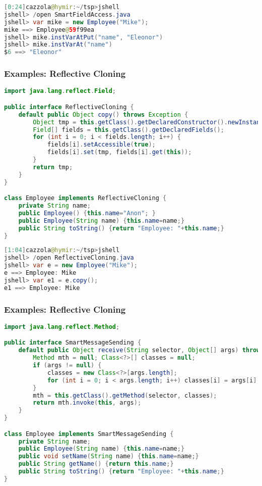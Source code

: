 \begin{lstlisting}[language=Java]
[0:24]cazzola@hymir:~/tsp>jshell
jshell> /open SmartFieldAccess.java
jshell> var mike = new Employee("Mike");
mike ==> Employee@59f99ea
jshell> mike.instVarAtPut("name", "Eleonor")
jshell> mike.instVarAt("name")
$6 ==> "Eleonor"
\end{lstlisting}

\subsubsection{Examples: Reflective Cloning}

\begin{lstlisting}[language=Java]
import java.lang.reflect.Field;

public interface ReflectiveCloning {
	default public Object copy() throws Exception {
		Object tmp = this.getClass().getDeclaredConstructor().newInstance() ;
		Field[] fields = this.getClass().getDeclaredFields();
		for (int i = 0; i < fields.length; i++) {
			fields[i].setAccessible(true);
			fields[i].set(tmp, fields[i].get(this));
		}
		return tmp;
	}
}

class Employee implements ReflectiveCloning {
	private String name;
	public Employee() {this.name="Anon"; }
	public Employee(String name) {this.name=name;}
	public String toString() {return "Employee: "+this.name;}
}
\end{lstlisting}

\begin{lstlisting}[language=Java]
[1:04]cazzola@hymir:~/tsp>jshell
jshell> /open ReflectiveCloning.java
jshell> var e = new Employee("Mike");
e ==> Employee: Mike
jshell> var e1 = e.copy();
e1 ==> Employee: Mike
\end{lstlisting}

\subsubsection{Examples: Reflective Cloning}

\begin{lstlisting}[language=Java]
import java.lang.reflect.Method;

public interface SmartMessageSending {
	default public Object receive(String selector, Object[] args) throws Exception {
		Method mth = null; Class<?>[] classes = null;
		if (args != null) {
			classes = new Class<?>[args.length];
			for (int i = 0; i < args.length; i++) classes[i] = args[i].getClass();
		}
		mth = this.getClass().getMethod(selector, classes);
		return mth.invoke(this, args);
	}
}

class Employee implements SmartMessageSending {
	private String name;
	public Employee(String name) {this.name=name;}
	public void setName(String name) {this.name=name;}
	public String getName() {return this.name;}
	public String toString() {return "Employee: "+this.name;}
}
\end{lstlisting}

